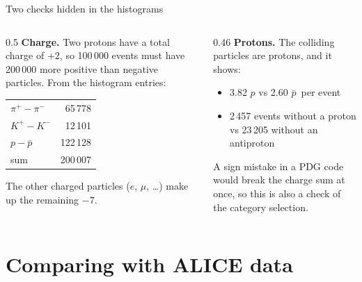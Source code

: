 \documentclass[aspectratio=169,11pt]{beamer}
\newcommand{\pbar}{\ensuremath{\bar{p}}}
\begin{document}
\begin{frame}{Two checks hidden in the histograms}
  \begin{columns}[T]
    \begin{column}{0.5\textwidth}
      \textbf{Charge.} Two protons have a total charge of $+2$, so 100\,000 events must have
      200\,000 more positive than negative particles. From the histogram entries:
      \small
      \begin{center}
      \begin{tabular}{lr}
        \toprule
        $\pi^+ - \pi^-$ & 65\,778 \\
        $K^+ - K^-$     & 12\,101 \\
        $p - \pbar$     & 122\,128 \\
        \midrule
        sum             & \alert{200\,007} \\
        \bottomrule
      \end{tabular}
      \end{center}
      The other charged particles ($e$, $\mu$, \dots) make up the remaining $-7$.
    \end{column}
    \begin{column}{0.46\textwidth}
      \textbf{Protons.} The colliding particles are protons, and it shows:
      \begin{itemize}
        \item 3.82 $p$ vs 2.60 \pbar\ per event
        \item 2\,457 events without a proton vs 23\,205 without an antiproton
      \end{itemize}

      \vspace{0.5em}
      A sign mistake in a PDG code would break the charge sum at once, so this is also
      a check of the category selection.
    \end{column}
  \end{columns}
\end{frame}

\section{Comparing with ALICE data}
\end{document}
